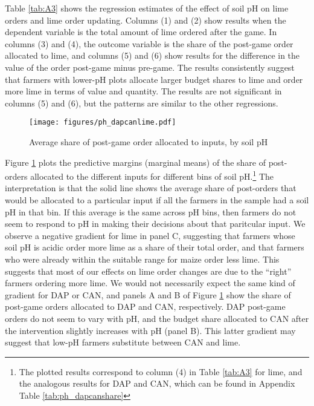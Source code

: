 \documentclass[12pt,letterpaper]{article}
\begin{document}


Table \ref{tab:A3} shows the regression estimates of the effect of soil pH on lime orders and lime order updating. Columns (1) and (2) show results when the dependent variable is the total amount of lime ordered after the game. In columns (3) and (4), the outcome variable is the share of the post-game order allocated to lime, and columns (5) and (6) show results for the difference in the value of the order post-game minus pre-game. The results consistently suggest that farmers with lower-pH plots allocate larger budget shares to lime and order more lime in terms of value and quantity. The results are not significant in columns (5) and (6), but the patterns are similar to the other regressions.

\begin{figure}[H] 
\caption{Average share of post-game order allocated to inputs, by soil pH} 
\label{fig:ph}
\hspace{-.5cm} \centerline{\texttt{[image: figures/ph\_dapcanlime.pdf]}}
\end{figure}

Figure \ref{fig:ph} plots the predictive margins (marginal means) of the share of post-orders allocated to the different inputs for different bins of soil pH.\footnote{The plotted results correspond to column (4) in Table \ref{tab:A3} for lime, and the analogous results for DAP and CAN, which can be found in Appendix Table \ref{tab:ph_dapcanshare}} The interpretation is that the solid line shows the average share of post-orders that would be allocated to a particular input if all the farmers in the sample had a soil pH in that bin. If this average is the same across pH bins, then farmers do not seem to respond to pH in making their decisions about that paritcular input. We observe a negative gradient for lime in panel C, suggesting that farmers whose soil pH is acidic order more lime as a share of their total order, and that farmers who were already within the suitable range for maize order less lime. This suggests that most of our effects on lime order changes are due to the ``right'' farmers ordering more lime. We would not necessarily expect the same kind of gradient for DAP or CAN, and panels A and B of Figure \ref{fig:ph} show the share of post-game orders allocated to DAP and CAN, respectively. DAP post-game orders do not seem to vary with pH, and the budget share allocated to CAN after the intervention slightly increases with pH (panel B). This latter gradient may suggest that low-pH farmers substitute between CAN and lime.   
\end{document}
